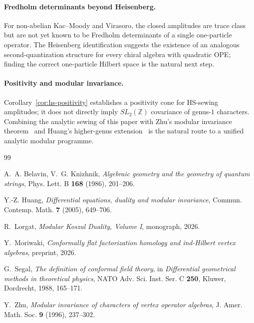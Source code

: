 \documentclass[11pt,reqno]{amsart}
\theoremstyle{definition}
\theoremstyle{remark}
\numberwithin{equation}{section}
\begin{document}
\paragraph{Fredholm determinants beyond Heisenberg.}
For non-abelian Kac--Moody and Virasoro, the closed amplitudes
are trace class but are not yet known to be Fredholm determinants
of a single one-particle operator. The Heisenberg identification
suggests the existence of an analogous second-quantization
structure for every chiral algebra with quadratic OPE; finding
the correct one-particle Hilbert space is the natural next step.

\paragraph{Positivity and modular invariance.}
Corollary~\ref{cor:hs-positivity} establishes a positivity
cone for HS-sewing amplitudes; it does not directly imply
$SL_2(\mathbb{Z})$ covariance of genus-$1$ characters. Combining
the analytic sewing of this paper with Zhu's modular invariance
theorem~\cite{Zhu96} and Huang's higher-genus
extension~\cite{Huang05} is the natural route to a unified
analytic modular programme.

\begin{thebibliography}{99}

A.~A. Belavin, V.~G. Knizhnik,
\emph{Algebraic geometry and the geometry of quantum strings},
Phys. Lett. B \textbf{168} (1986), 201--206.

Y.-Z. Huang,
\emph{Differential equations, duality and modular invariance},
Commun. Contemp. Math. \textbf{7} (2005), 649--706.

R.~Lorgat,
\emph{Modular Koszul Duality, Volume I},
monograph, 2026.

Y.~Moriwaki,
\emph{Conformally flat factorization homology and ind-Hilbert
vertex algebras},
preprint, 2026.

G.~Segal,
\emph{The definition of conformal field theory},
in \emph{Differential geometrical methods in theoretical
physics}, NATO Adv. Sci. Inst. Ser. C \textbf{250}, Kluwer,
Dordrecht, 1988, 165--171.

Y.~Zhu,
\emph{Modular invariance of characters of vertex operator
algebras},
J. Amer. Math. Soc. \textbf{9} (1996), 237--302.

\end{thebibliography}
\end{document}

